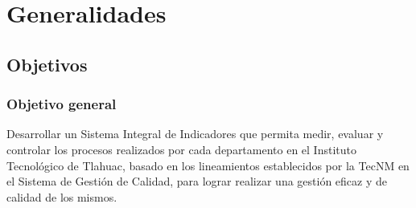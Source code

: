 \chapter{Generalidades}
    
    
    \section{Objetivos}

\subsection{Objetivo general}

Desarrollar un Sistema  Integral de Indicadores que permita medir, evaluar y controlar los procesos realizados por cada departamento en el Instituto Tecnol\'ogico de Tlahuac, basado en los lineamientos establecidos por la TecNM en el Sistema de Gesti\'on de Calidad, para lograr realizar una gesti\'on eficaz y de calidad de los mismos.\\

